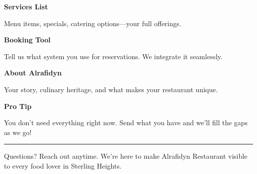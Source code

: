 \documentclass[11pt,letterpaper]{article}
\begin{document}
\hfill
\begin{minipage}[t]{0.48\textwidth}
\begin{tcolorbox}[colframe=accent-teal, boxrule=1pt, left=0.7em, right=0.7em, top=0.5em, bottom=0.5em, arc=4pt, boxsep=0pt]
{\bfseries\small\color{accent-teal}Services List}

\vspace{0.15em}

{\small Menu items, specials, catering options—your full offerings.}
\end{tcolorbox}

\vspace{0.1em}

\begin{tcolorbox}[colframe=accent-teal, boxrule=1pt, left=0.7em, right=0.7em, top=0.5em, bottom=0.5em, arc=4pt, boxsep=0pt]
{\bfseries\small\color{accent-teal}Booking Tool}

\vspace{0.15em}

{\small Tell us what system you use for reservations. We integrate it seamlessly.}
\end{tcolorbox}

\vspace{0.1em}

\begin{tcolorbox}[colframe=accent-teal, boxrule=1pt, left=0.7em, right=0.7em, top=0.5em, bottom=0.5em, arc=4pt, boxsep=0pt]
{\bfseries\small\color{accent-teal}About Alrafidyn}

\vspace{0.15em}

{\small Your story, culinary heritage, and what makes your restaurant unique.}
\end{tcolorbox}

\vspace{-0.2em}
\end{minipage}

\vspace{0.15em}

\begin{tcolorbox}[colback={accent-red!5}, colframe=accent-red!20, boxrule=0.5pt, left=0.7em, right=0.7em, top=0.4em, bottom=0.4em, arc=6pt, boxsep=0pt]

{\bfseries\small\color{accent-red}Pro Tip}

\vspace{0.1em}

{\small You don't need everything right now. Send what you have and we'll fill the gaps as we go!}

\end{tcolorbox}

\vspace{0.15em}

\noindent\hrule
\vspace{0.2em}

{\small\color{text-light}Questions? Reach out anytime. We're here to make Alrafidyn Restaurant visible to every food lover in Sterling Heights.}
\end{document}
